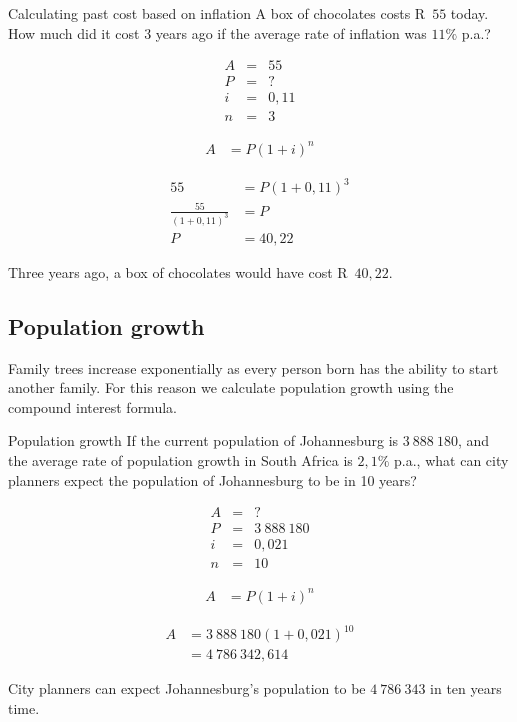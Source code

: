 \begin{wex}{Calculating past cost based on inflation}
    {A box of chocolates costs R~$55$ today. How much did it cost 3 years ago if the average rate of inflation was $11\%$ p.a.?}{
    
    \begin{eqnarray*}
	A &=& 55\\
	P &=& ?\\
	i &=& 0,11\\
	n &=& 3
    \end{eqnarray*}

    \begin{align*}
	A &= P(1 + i)^n
    \end{align*}

    \begin{align*}
	55 &= P(1 + 0,11)^3\\
	\frac{55}{(1 + 0,11)^3} &= P\\
	P  &= 40,22
    \end{align*}

    Three years ago, a box of chocolates would have cost R~$40,22$.
    }
\end{wex}


\subsection{Population growth}

Family trees increase exponentially as every person born has the ability to start another family. For this reason we calculate population growth using the compound interest formula.


\begin{wex}{Population growth}
    {If the current population of Johannesburg is $3~888~180$, and the average rate of population growth in South Africa is $2,1\%$ p.a., what can city planners expect the population of Johannesburg to be in 10 years?}{
    
    \begin{eqnarray*}
	A &=& ?\\
	P &=& 3~888~180\\
	i &=& 0,021\\
	n &=& 10
    \end{eqnarray*}

    \begin{align*}
	A &= P(1 + i)^n
    \end{align*}

    \begin{align*}
	A &= 3~888~180(1 + 0,021)^{10}\\
	  &= 4~786~342,614
    \end{align*}

    City planners can expect Johannesburg's population to be $4~786~343$ in ten years time.
    }
\end{wex}


